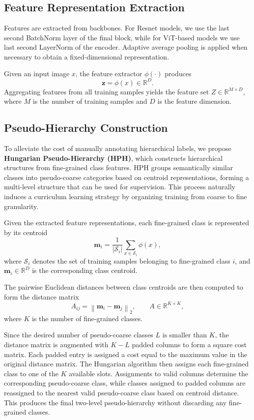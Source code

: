 \documentclass[conference,a4paper]{IEEEtran}
\begin{document}
\subsection{Feature Representation Extraction}
Features are extracted from backbones. For Resnet models, we use the last second BatchNorm layer  of the final block, while for ViT-based models we use last second LayerNorm of the encoder. Adaptive average pooling is applied when necessary to obtain a fixed-dimensional representation.

Given an input image $x$, the feature extractor $\phi(\cdot)$ produces
\[
\mathbf{z} = \phi(x) \in \mathbb{R}^{D}.
\]
Aggregating features from all training samples yields the feature set $Z \in \mathbb{R}^{M \times D}$, where $M$ is the number of training samples and $D$ is the feature dimension.

\subsection{Pseudo-Hierarchy Construction}
To alleviate the cost of manually annotating hierarchical labels, we propose \textbf{Hungarian Pseudo-Hierarchy (HPH)}, which constructs hierarchical structures from fine-grained class features. HPH groups semantically similar classes into pseudo-coarse categories based on centroid representations, forming a multi-level structure that can be used for supervision. This process naturally induces a curriculum learning strategy by organizing training from coarse to fine granularity.

Given the extracted feature representations, each fine-grained class is represented by its centroid
\[
\mathbf{m}_i
=
\frac{1}{|\mathcal{S}_i|}
\sum_{x\in\mathcal{S}_i}
\phi(x),
\]
where $\mathcal{S}_i$ denotes the set of training samples belonging to fine-grained class $i$, and $\mathbf{m}_i\in\mathbb{R}^{D}$ is the corresponding class centroid. 

The pairwise Euclidean distances between class centroids are then computed to form the distance matrix
\[
A_{ij}
=
\left\|
\mathbf{m}_i-\mathbf{m}_j
\right\|_2,
\qquad
A\in\mathbb{R}^{K\times K},
\]
where $K$ is the number of fine-grained classes.

Since the desired number of pseudo-coarse classes $L$ is smaller than $K$, the distance matrix is augmented with $K-L$ padded columns to form a square cost matrix. Each padded entry is assigned a cost equal to the maximum value in the original distance matrix. The Hungarian algorithm \cite{kuhn_hungarian_1955} then assigns each fine-grained class to one of the $K$ available slots. Assignments to valid columns determine the corresponding pseudo-coarse class, while classes assigned to padded columns are reassigned to the nearest valid pseudo-coarse class based on centroid distance. This produces the final two-level pseudo-hierarchy without discarding any fine-grained classes.
\end{document}
